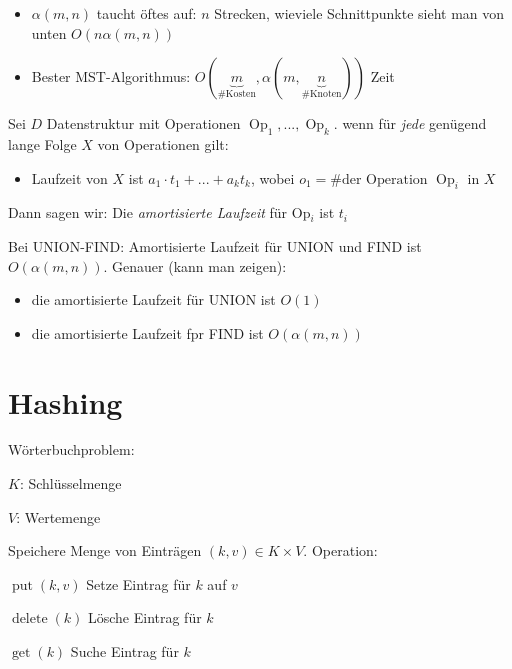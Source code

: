 \begin{itemize}
 \item $\alpha(m,n)$ taucht öftes auf: $n$ Strecken, wieviele Schnittpunkte sieht man von unten $O(n \alpha(m,n))$
 \item Bester MST-Algorithmus: $O(\underbrace{m}_{\text{\# Kosten}}, \alpha(m,\underbrace{n}_{\text{\# Knoten}}))$ Zeit
\end{itemize}

\Defi Sei $D$ Datenstruktur mit Operationen $\operatorname{Op}_1, ..., \operatorname{Op}_k$.
         wenn für \emph{jede} genügend lange Folge $X$ von Operationen gilt: 
         \begin{itemize}
         \item Laufzeit von $X$ ist $a_1 \cdot t_1 + ... + a_k t_k$, wobei $o_1 = \text{\# der Operation $\operatorname{Op}_i$ in $X$}$
         \end{itemize}
         Dann sagen wir: Die \emph{amortisierte Laufzeit} für Op$_i$ ist $t_i$

Bei UNION-FIND: Amortisierte  Laufzeit für UNION und FIND ist $O(\alpha(m,n))$. Genauer (kann man zeigen):
\begin{itemize}
 \item die amortisierte Laufzeit für UNION ist $O(1)$
 \item die amortisierte Laufzeit fpr FIND ist $O(\alpha(m,n))$
\end{itemize}

\section{Hashing}
Wörterbuchproblem:
\begin{description}
 \item $K$: Schlüsselmenge
 \item $V$: Wertemenge
\end{description}
Speichere Menge von Einträgen $(k,v) \in K \times V$. Operation:
\begin{description}
 \item $\operatorname{put}(k,v)$ Setze Eintrag für $k$ auf $v$
 \item $\operatorname{delete}(k)$ Lösche Eintrag für $k$
 \item $\operatorname{get}(k)$ Suche Eintrag für $k$
\end{description}

